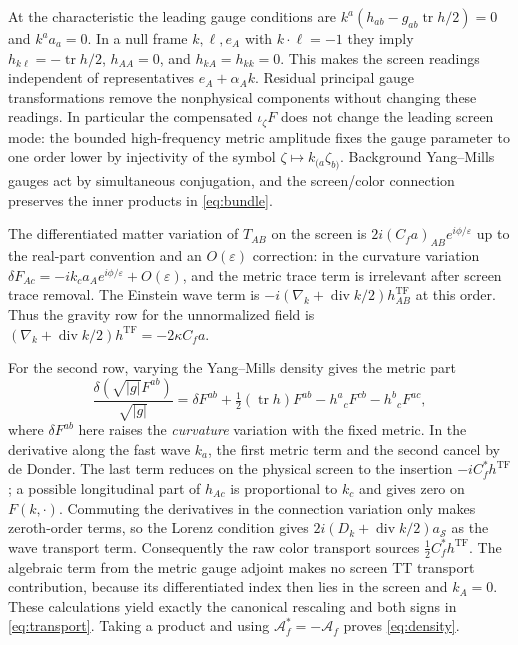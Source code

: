 \documentclass[11pt]{article}
\newcommand{\TF}{\mathrm{TF}}
\newcommand{\tr}{\operatorname{tr}}
\newcommand{\Div}{\operatorname{div}}
\newcommand{\eps}{\varepsilon}
\begin{document}
At the characteristic the leading gauge conditions are \(k^a(h_{ab}-g_{ab}\tr h/2)=0\) and \(k^aa_a=0\). In a null frame \(k,\ell,e_A\) with \(k\cdot\ell=-1\) they imply \(h_{k\ell}=-\tr h/2\), \(h_{AA}=0\), and \(h_{kA}=h_{kk}=0\). This makes the screen readings independent of representatives \(e_A+\alpha_Ak\). Residual principal gauge transformations remove the nonphysical components without changing these readings. In particular the compensated \(\iota_\zeta F\) does not change the leading screen mode: the bounded high-frequency metric amplitude fixes the gauge parameter to one order lower by injectivity of the symbol \(\zeta\mapsto k_{(a}\zeta_{b)}\). Background Yang--Mills gauges act by simultaneous conjugation, and the screen/color connection preserves the inner products in \eqref{eq:bundle}.

The differentiated matter variation of \(T_{AB}\) on the screen is
\(2i(C_f a)_{AB} e^{i\phi/\eps}\) up to the real-part convention and an \(O(\eps)\) correction: in the curvature variation \(\delta F_{A c}=-ik_c a_A e^{i\phi/\eps}+O(\eps)\), and the metric trace term is irrelevant after screen trace removal. The Einstein wave term is \(-i(\nabla_k+\Div k/2)h^{\TF}_{AB}\) at this order. Thus the gravity row for the unnormalized field is
\((\nabla_k+\Div k/2)h^{\TF}=-2\kappa C_f a\).

For the second row, varying the Yang--Mills density gives the metric part
\[
 \frac{\delta(\sqrt{|g|}F^{ab})}{\sqrt{|g|}}
  =\delta F^{ab}
    +\tfrac12(\tr h)F^{ab}-h^a{}_cF^{cb}-h^b{}_cF^{ac},
\]
where \(\delta F^{ab}\) here raises the \emph{curvature} variation with the fixed metric. In the derivative along the fast wave \(k_a\), the first metric term and the second cancel by de Donder. The last term reduces on the physical screen to the insertion \(-i C_f^*h^{\TF}\); a possible longitudinal part of \(h_{Ac}\) is proportional to \(k_c\) and gives zero on \(F(k,\cdot)\). Commuting the derivatives in the connection variation only makes zeroth-order terms, so the Lorenz condition gives \(2i(D_k+\Div k/2)a_{\mathcal S}\) as the wave transport term. Consequently the raw color transport sources \(\frac12 C_f^*h^{\TF}\). The algebraic term from the metric gauge adjoint makes no screen TT transport contribution, because its differentiated index then lies in the screen and \(k_A=0\). These calculations yield exactly the canonical rescaling and both signs in \eqref{eq:transport}. Taking a product and using \(\mathcal A_f^*=-\mathcal A_f\) proves \eqref{eq:density}.
\end{document}
